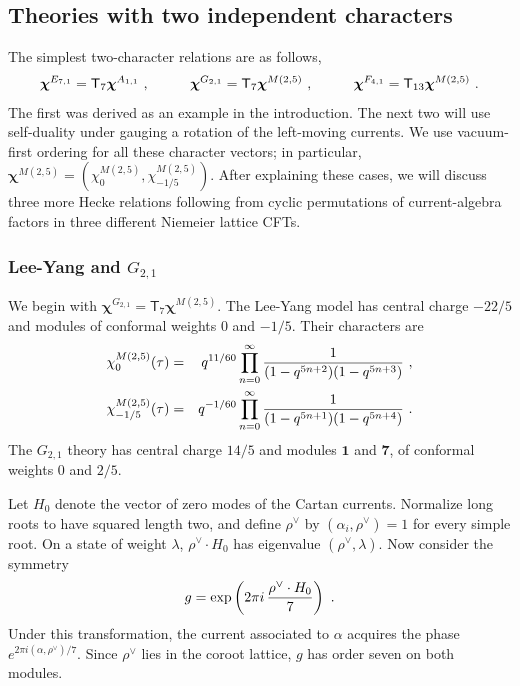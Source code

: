 \documentclass[12pt]{article}
\numberwithin{equation}{section}
\newcommand{\bea}{\begin{eqnarray}}
\newcommand{\eea}{\end{eqnarray}}
\def\no{\nonumber}
\theoremstyle{remark}
\begin{document}
\subsection{Theories with two independent characters}

The simplest two-character relations are as follows,
\bea
\boldsymbol{\chi}^{E_{7,1}}=\mathsf T_7\boldsymbol{\chi}^{A_{1,1}}~,
\hspace{0.4 in}
\boldsymbol{\chi}^{G_{2,1}}=\mathsf T_7\boldsymbol{\chi}^{M(2,5)}~,
\hspace{0.4 in}
\boldsymbol{\chi}^{F_{4,1}}=\mathsf T_{13}\boldsymbol{\chi}^{M(2,5)}~.
\eea
The first was derived as an example in the introduction. The next two will use self-duality under gauging a rotation of the left-moving currents. We use vacuum-first ordering for all these character vectors; in particular, $\boldsymbol{\chi}^{M(2,5)}=(\chi^{M(2,5)}_0,\chi^{M(2,5)}_{-1/5})$. 
After explaining these cases, we will discuss three more Hecke relations following from cyclic permutations of current-algebra factors in three different Niemeier lattice CFTs.

\subsubsection{Lee-Yang and $G_{2,1}$}
\label{sec:exceptional}

We begin with $\boldsymbol{\chi}^{G_{2,1}}=\mathsf T_7\boldsymbol{\chi}^{M(2,5)}$. The Lee-Yang model has central charge $-22/5$ and modules of conformal weights $0$ and $-1/5$. Their characters are
\bea \label{eq:LYproducts}
\chi^{M(2,5)}_0(\tau)&=&q^{11/60}\prod_{n=0}^{\infty}{1\over (1-q^{5n+2})(1-q^{5n+3})}~,\no\\
\chi^{M(2,5)}_{-1/5}(\tau)&=&q^{-1/60}\prod_{n=0}^{\infty}{1\over (1-q^{5n+1})(1-q^{5n+4})}~.
\eea
The $G_{2,1}$ theory has central charge $14/5$ and modules $\mathbf1$ and $\mathbf7$, of conformal weights $0$ and $2/5$. 

Let $H_0$ denote the vector of zero modes of the Cartan currents. Normalize long roots to have squared length two, and define $\rho^\vee$ by $(\alpha_i,\rho^\vee)=1$ for every simple root. On a state of weight $\lambda$, $\rho^\vee\cdot H_0$ has eigenvalue $(\rho^\vee,\lambda)$. Now consider the symmetry
\bea 
\label{eq:G2g}
g=\exp\left(2\pi i\,{\rho^\vee\cdot H_0\over 7}\right)~.
\eea
Under this transformation, the current associated to $\alpha$ acquires the phase $e^{2\pi i(\alpha,\rho^\vee)/7}$. Since $\rho^\vee$ lies in the coroot lattice, $g$ has order seven on both modules.
\end{document}
